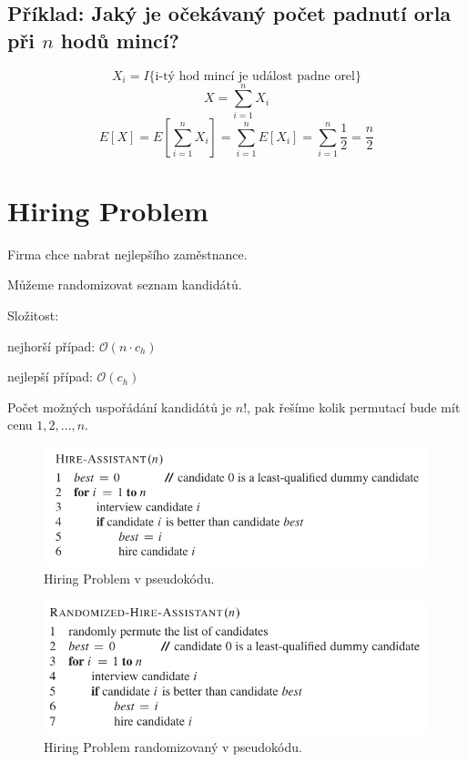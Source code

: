 \subsection{Příklad: Jaký je očekávaný počet padnutí orla při $n$ hodů mincí?}

$$ X_i = I\{ \text{i-tý hod mincí je událost padne orel} \}$$
$$ X = \sum_{i=1}^n X_i$$
$$ E[X] = E \left[ \sum_{i=1}^n X_i \right] = \sum_{i=1}^n E \left[ X_i \right] = \sum_{i=1}^n \frac{1}{2} = \frac{n}{2}$$


\section{Hiring Problem}

\begin{compactitem}
    \item Firma chce nabrat nejlepšího zaměstnance.

    \item Můžeme randomizovat seznam kandidátů.

    \item Složitost: \begin{compactitem}
        \item nejhorší případ: $\mathcal{O}(n \cdot c_h)$
        \item nejlepší případ: $\mathcal{O}(c_h)$
    \end{compactitem}

    \item Počet možných uspořádání kandidátů je $n!$, pak řešíme kolik permutací bude mít cenu $1, 2, \dots, n$.

\end{compactitem}

\begin{figure}[H]
    \centering
    \includegraphics[width=0.8\linewidth]{hiring_problem.pdf}
    \caption{Hiring Problem v pseudokódu.}
\end{figure}

\begin{figure}[H]
    \centering
    \includegraphics[width=0.8\linewidth]{hiring_problem_randomized.pdf}
    \caption{Hiring Problem randomizovaný v pseudokódu.}
\end{figure}

